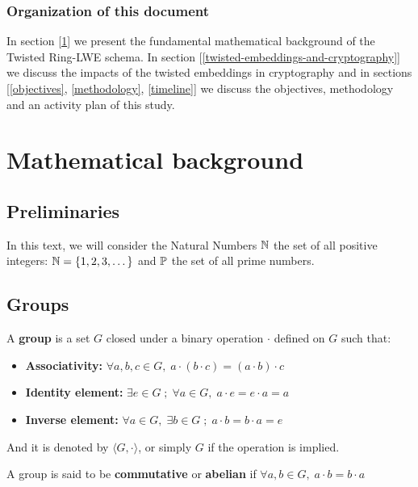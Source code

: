 \documentclass[a4paper,12pt]{article}
\begin{document}
\subsubsection*{Organization of this document}
\label{sec:orgbe17419}
In section [\ref{mathematical-background}] we present the fundamental mathematical background of the Twisted Ring-LWE schema. In section [\ref{twisted-embeddings-and-cryptography}] we discuss the impacts of the twisted embeddings in cryptography and in sections [\ref{objectives}, \ref{methodology}, \ref{timeline}] we discuss the objectives, methodology and an activity plan of this study.
\section{Mathematical background}
\label{mathematical-background}
\subsection{Preliminaries}
\label{sec:orgaf89ec4}
In this text, we will consider the Natural Numbers \(\N\) the set of all positive integers: \(\N = \{1,2,3,\dots\}\) and \(\P\) the set of all prime numbers. 
\subsection{Groups}
\label{sec:org7ec7728}

\begin{definition}
  A \textbf{group} is a set $G$ closed under a binary operation $\cdot$ defined on $G$ such
  that:
  \begin{itemize}
  \item \textbf{Associativity: } $\forall a,b,c \in G, \; a\cdot(b\cdot c) = (a\cdot b)\cdot c$
  \item \textbf{Identity element: } $\exists e \in G \; ; \; \forall a \in G, \; a\cdot e = e\cdot a = a$
  \item \textbf{Inverse element: } $\forall a \in G, \; \exists b \in G \; ; \; a\cdot b = b \cdot a = e$
  \end{itemize}
And it is denoted by $\langle G,\cdot\rangle$, or simply $G$ if the operation is implied.
\end{definition}

\begin{definition}
  A group is said to be \textbf{commutative} or \textbf{abelian}
  if $\forall a, b \in G, \; a\cdot b = b\cdot a$
\end{definition}
\end{document}
